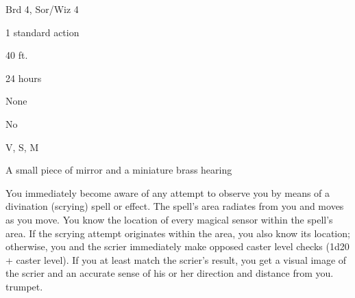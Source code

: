 
\begin{description*}
\item[Level:] Brd 4, Sor/Wiz 4
\item[Casting Time:] 1 standard action
\item[Range:] 40 ft.
\item[Duration:] 24 hours
\item[Saving Throw:] None
\item[Spell Resistance:] No
\item[Components:] V, S, M
\item[Arcane Material Component:] A small piece of mirror and a miniature brass hearing
\end{description*}

You immediately become aware of any attempt to observe you by means of a divination
(scrying) spell or effect. The spell's area radiates from you and moves as you
move. You know the location of every magical sensor within the spell's area.
If the scrying attempt originates within the area, you also know its location;
otherwise, you and the scrier immediately make opposed caster level checks (1d20
+ caster level). If you at least match the scrier's result, you get a visual image
of the scrier and an accurate sense of his or her direction and distance from you.
trumpet.
